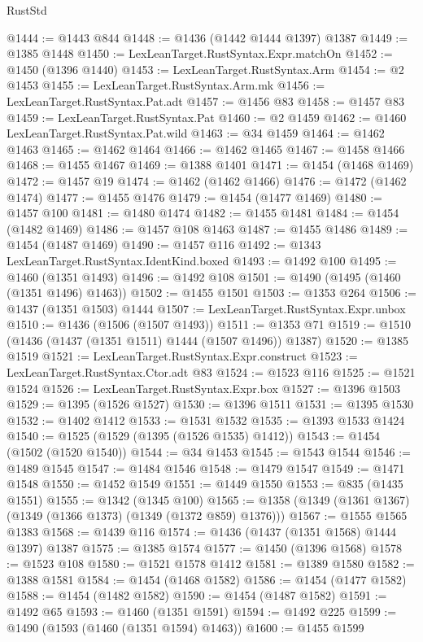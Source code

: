 \begin{lexlean}{RustStd}
\begin{coremodule}
@1444 := @1443 @844
@1448 := @1436 (@1442 @1444 @1397) @1387
@1449 := @1385 @1448
@1450 := LexLeanTarget.RustSyntax.Expr.matchOn
@1452 := @1450 (@1396 @1440)
@1453 := LexLeanTarget.RustSyntax.Arm
@1454 := @2 @1453
@1455 := LexLeanTarget.RustSyntax.Arm.mk
@1456 := LexLeanTarget.RustSyntax.Pat.adt
@1457 := @1456 @83
@1458 := @1457 @83
@1459 := LexLeanTarget.RustSyntax.Pat
@1460 := @2 @1459
@1462 := @1460 LexLeanTarget.RustSyntax.Pat.wild
@1463 := @34 @1459
@1464 := @1462 @1463
@1465 := @1462 @1464
@1466 := @1462 @1465
@1467 := @1458 @1466
@1468 := @1455 @1467
@1469 := @1388 @1401
@1471 := @1454 (@1468 @1469)
@1472 := @1457 @19
@1474 := @1462 (@1462 @1466)
@1476 := @1472 (@1462 @1474)
@1477 := @1455 @1476
@1479 := @1454 (@1477 @1469)
@1480 := @1457 @100
@1481 := @1480 @1474
@1482 := @1455 @1481
@1484 := @1454 (@1482 @1469)
@1486 := @1457 @108 @1463
@1487 := @1455 @1486
@1489 := @1454 (@1487 @1469)
@1490 := @1457 @116
@1492 := @1343 LexLeanTarget.RustSyntax.IdentKind.boxed
@1493 := @1492 @100
@1495 := @1460 (@1351 @1493)
@1496 := @1492 @108
@1501 := @1490 (@1495 (@1460 (@1351 @1496) @1463))
@1502 := @1455 @1501
@1503 := @1353 @264
@1506 := @1437 (@1351 @1503) @1444
@1507 := LexLeanTarget.RustSyntax.Expr.unbox
@1510 := @1436 (@1506 (@1507 @1493))
@1511 := @1353 @71
@1519 := @1510 (@1436 (@1437 (@1351 @1511) @1444 (@1507 @1496)) @1387)
@1520 := @1385 @1519
@1521 := LexLeanTarget.RustSyntax.Expr.construct
@1523 := LexLeanTarget.RustSyntax.Ctor.adt @83
@1524 := @1523 @116
@1525 := @1521 @1524
@1526 := LexLeanTarget.RustSyntax.Expr.box
@1527 := @1396 @1503
@1529 := @1395 (@1526 @1527)
@1530 := @1396 @1511
@1531 := @1395 @1530
@1532 := @1402 @1412
@1533 := @1531 @1532
@1535 := @1393 @1533 @1424
@1540 := @1525 (@1529 (@1395 (@1526 @1535) @1412))
@1543 := @1454 (@1502 (@1520 @1540))
@1544 := @34 @1453
@1545 := @1543 @1544
@1546 := @1489 @1545
@1547 := @1484 @1546
@1548 := @1479 @1547
@1549 := @1471 @1548
@1550 := @1452 @1549
@1551 := @1449 @1550
@1553 := @835 (@1435 @1551)
@1555 := @1342 (@1345 @100)
@1565 := @1358 (@1349 (@1361 @1367) (@1349 (@1366 @1373) (@1349 (@1372 @859) @1376)))
@1567 := @1555 @1565 @1383
@1568 := @1439 @116
@1574 := @1436 (@1437 (@1351 @1568) @1444 @1397) @1387
@1575 := @1385 @1574
@1577 := @1450 (@1396 @1568)
@1578 := @1523 @108
@1580 := @1521 @1578 @1412
@1581 := @1389 @1580
@1582 := @1388 @1581
@1584 := @1454 (@1468 @1582)
@1586 := @1454 (@1477 @1582)
@1588 := @1454 (@1482 @1582)
@1590 := @1454 (@1487 @1582)
@1591 := @1492 @65
@1593 := @1460 (@1351 @1591)
@1594 := @1492 @225
@1599 := @1490 (@1593 (@1460 (@1351 @1594) @1463))
@1600 := @1455 @1599

\end{coremodule}
\end{lexlean}

